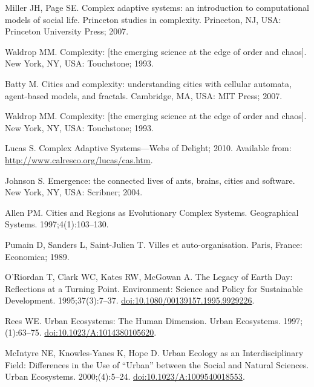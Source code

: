 \documentclass[10pt,a4paper]{article}
\begin{document}
\begin{multicols}{2}
\begin{footnotesize}
\begin{thebibliography}{100}
Miller JH, Page SE.
\newblock Complex adaptive systems: an introduction to computational models of
  social life.
\newblock Princeton studies in complexity. Princeton, NJ, USA: Princeton
  University Press; 2007.

Waldrop MM.
\newblock Complexity: [the emerging science at the edge of order and chaos].
\newblock New York, NY, USA: Touchstone; 1993.

Batty M.
\newblock Cities and complexity: understanding cities with cellular automata,
  agent-based models, and fractals.
\newblock Cambridge, MA, USA: MIT Press; 2007.

Waldrop MM.
\newblock Complexity: [the emerging science at the edge of order and chaos].
\newblock New York, NY, USA: Touchstone; 1993.

Lucas S. Complex {Adaptive} {Systems}---{Webs} of {Delight}; 2010.
\newblock Available from: \url{http://www.calresco.org/lucas/cas.htm}.

Johnson S.
\newblock Emergence: the connected lives of ants, brains, cities and software.
\newblock New York, NY, USA: Scribner; 2004.

Allen PM.
\newblock Cities and {Regions} as {Evolutionary} {Complex} {Systems}.
\newblock Geographical Systems. 1997;4(1):103--130.

Pumain D, Sanders L, Saint-Julien T.
\newblock Villes et auto-organisation.
\newblock Paris, France: Economica; 1989.

O'Riordan T, Clark WC, Kates RW, McGowan A.
\newblock The {Legacy} of {Earth} {Day}: {Reflections} at a {Turning} {Point}.
\newblock Environment: Science and Policy for Sustainable Development.
  1995;37(3):7--37.
\newblock
  \href{https://doi.org/10.1080/00139157.1995.9929226}{doi:10.1080/00139157.1995.9929226}.

Rees WE.
\newblock Urban {Ecosystems}: {The} {Human} {Dimension}.
\newblock Urban Ecosystems. 1997;(1):63--75.
\newblock
  \href{https://doi.org/10.1023/A:1014380105620}{doi:10.1023/A:1014380105620}.

McIntyre NE, Knowles-Yanes K, Hope D.
\newblock Urban {Ecology} as an {Interdisciplinary} {Field}: {Differences} in
  the {Use} of ``{Urban}'' between the {Social} and {Natural} {Sciences}.
\newblock Urban Ecosystems. 2000;(4):5--24.
\newblock
  \href{https://doi.org/10.1023/A:1009540018553}{doi:10.1023/A:1009540018553}.


\end{thebibliography}
\end{footnotesize}
\end{multicols}
\end{document}
